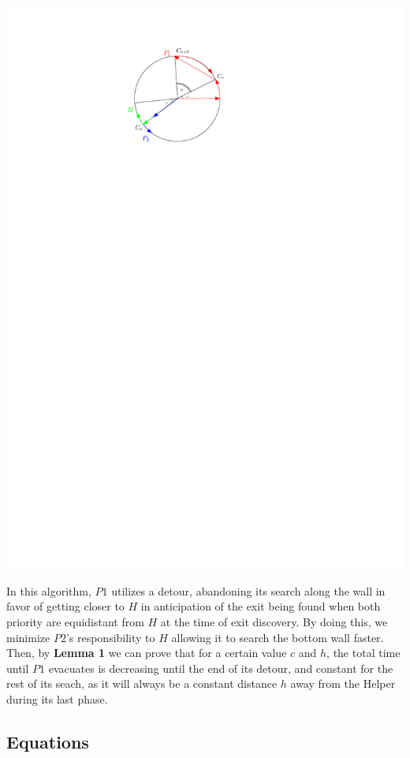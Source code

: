 \documentclass[11pt]{article}
\begin{document}
\begin{center}
\includegraphics{Q2S1_Eq/Q2S1_Old/Q2S1_DetourExample.pdf}
\end{center}
\begin{flushleft}
    In this algorithm, $P1$ utilizes a detour, abandoning its search along the wall
    in favor of getting closer to $H$ in anticipation of the exit being found when both
    priority are equidistant from $H$ at the time of exit discovery. By doing this, we minimize
    $P2$'s responsibility to $H$ allowing it to search the bottom wall faster. Then, by
    \textbf{Lemma 1} we can prove that for a certain value $c$ and $h$, the total time until $P1$
    evacuates is decreasing until the end of its detour, and constant for the rest of its seach, as
    it will always be a constant distance $h$ away from the Helper during its last phase.
\end{flushleft}

\subsection{Equations}
\end{document}
